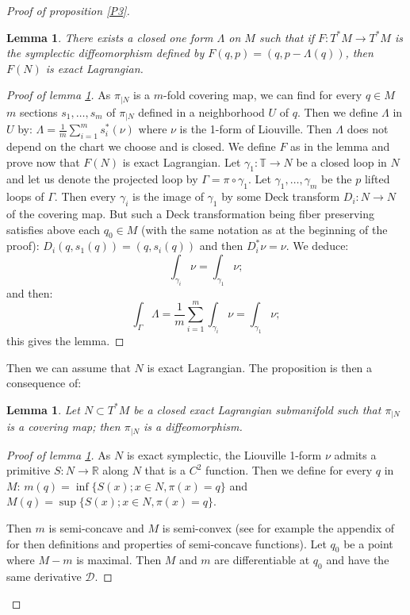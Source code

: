 \documentclass{dcds}
\newtheorem{lemma}[theorem]{Lemma}\newtheorem*{lem}{Lemma}
\theoremstyle{definition}
\begin{document}
\begin{proof}[Proof of proposition \ref{P3}]
\begin{lemma}\label{L2}
There exists a closed one form $\Lambda$ on $M$ such that if $F: T^*M\rightarrow T^*M$ is the symplectic diffeomorphism defined by $F(q,p)=(q, p-\Lambda(q))$, then $F(N)$ is  exact Lagrangian.\end{lemma}
\begin{proof}[Proof of lemma \ref{L2}]As $\pi_{|N}$ is a $m$-fold covering map, we can find for every $q\in M$ $m$ sections $s_1, \dots ,s_m$ of $\pi_{|N}$ defined in a neighborhood $U$ of $q$. Then we define $\Lambda$ in $U$ by: $\displaystyle{\Lambda=\frac{1}{m}\sum_{i=1}^ms_i^*(\nu)}$ where $\nu$ is the 1-form of Liouville. Then $\Lambda$ does not depend on the chart we choose and is closed. We define $F$ as in the lemma and prove now that $F(N)$ is exact Lagrangian. Let $\gamma_1:{\mathbb {T}}\rightarrow N$ be a closed loop in $N$ and let us denote the projected loop by $\Gamma=\pi\circ\gamma_1$.  Let $\gamma_1,\dots ,\gamma_m$ be the $p$ lifted loops of $\Gamma$. Then every $\gamma_i$ is the image of $\gamma_1$ by some Deck transform $D_i:N\rightarrow N$ of the covering map.  But such a Deck transformation being fiber preserving satisfies above each $q_0\in M$ (with the same notation as at the beginning of the proof): $D_i(q, s_1(q))=(q, s_i(q))$ and then $D_i^*\nu=\nu$. We deduce:
$$\int_{\gamma_i}\nu=\int_{\gamma_1}\nu;$$
and then:
$$\int_{\Gamma}\Lambda=\frac{1}{m}\sum_{i=1}^m\int_{\gamma_i}\nu=\int_{\gamma_1}\nu;$$
this gives the lemma.\end{proof}
Then we can assume that $N$ is exact Lagrangian. The proposition is then a consequence of:
\begin{lemma}\label{L3}
Let $N\subset  T^*M$ be a closed exact Lagrangian submanifold such that $\pi_{|N}$ is a covering map; then $\pi_{|N}$ is a diffeomorphism.

\end{lemma}
\begin{proof}[Proof of lemma \ref{L3}]
As $N$ is exact symplectic, the Liouville 1-form $\nu$ admits a primitive $S: N\rightarrow {\mathbb {R}}$ along $N$ that is a $C^2$ function. Then we define for every $q$ in $M$: $m(q)=\inf\{ S(x); x\in N, \pi(x)=q\}$ and $M(q)=\sup\{ S(x); x\in N, \pi(x)=q\}$.

Then $m$ is semi-concave and $M$ is semi-convex (see for example the appendix of \cite{Be1} for then definitions and properties of semi-concave functions).  Let $q_0$ be a point where $M-m$ is maximal.  Then  $M$ and $m$ are differentiable at $q_0$ and have the same derivative ${\mathcal {D}}$. 


\end{proof}
\end{proof}
\end{document}
